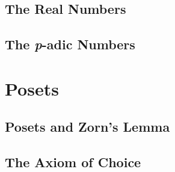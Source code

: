 \documentclass{memoir}
\begin{document}
    \section{The Real Numbers}
      \label{sec:reals}
      
      \newpage

    \section{The \emph{p}-adic Numbers}

  \chapter{Posets}
    \newpage

    \section{Posets and Zorn's Lemma}
      \label{sec:zorn}
      
      \newpage

    \section{The Axiom of Choice}


\backmatter
  \printindex
\end{document}
